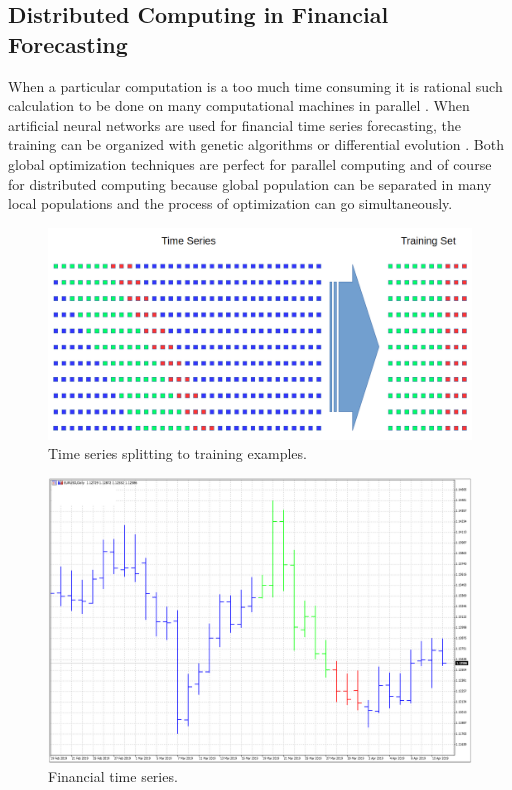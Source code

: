 \documentclass[runningheads]{llncs}
\begin{document}
\subsection{Distributed Computing in Financial Forecasting}
%
When a particular computation is a too much time consuming it is rational such calculation to be done on many computational machines in parallel \cite{distributed-computing-01}. When artificial neural networks are used for financial time series forecasting, the training can be organized with genetic algorithms \cite{genetic-algorithms-01} or differential evolution \cite{differential-evolution-01}. Both global optimization techniques are perfect for parallel computing and of course for distributed computing because global population can be separated in many local populations and the process of optimization can go simultaneously.
%
\begin{figure}
\includegraphics[width=\textwidth]{fig01.png}
\caption{Time series splitting to training examples.}
\label{fig01}
\end{figure}
%
\begin{figure}
\includegraphics[width=\textwidth]{fig02.png}
\caption{Financial time series.}
\label{fig02}
\end{figure}
\end{document}
